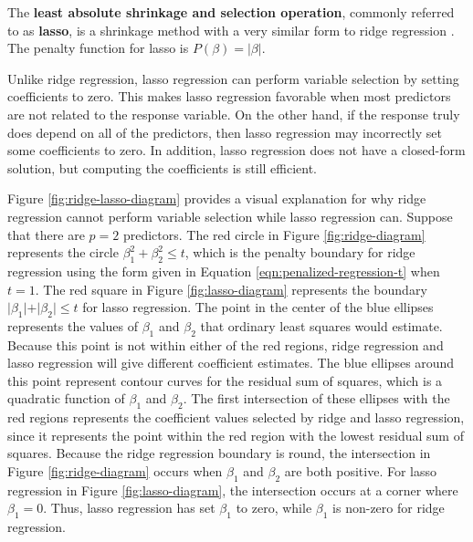 \documentclass{article}
\begin{document}
	The \textbf{least absolute shrinkage and selection operation}, commonly referred to as \textbf{lasso}, is a shrinkage method with a very similar form to ridge regression \cite{tibshirani1996regression, james2013introduction}. The penalty function for lasso is $P(\beta) = \vert \beta \vert$.
	
	Unlike ridge regression, lasso regression can perform variable selection by setting coefficients to zero. This makes lasso regression favorable when most predictors are not related to the response variable. On the other hand, if the response truly does depend on all of the predictors, then lasso regression may incorrectly set some coefficients to zero. In addition, lasso regression does not have a closed-form solution, but computing the coefficients is still efficient.
	
	Figure \ref{fig:ridge-lasso-diagram} provides a visual explanation for why ridge regression cannot perform variable selection while lasso regression can. Suppose that there are $p = 2$ predictors. The red circle in Figure \ref{fig:ridge-diagram} represents the circle $\beta_1^2 + \beta_2^2 \leq t$, which is the penalty boundary for ridge regression using the form given in Equation \ref{eqn:penalized-regression-t} when $t = 1$. The red square in Figure \ref{fig:lasso-diagram} represents the boundary $\vert \beta_1 \vert + \vert \beta_2 \vert \leq t$ for lasso regression. The point in the center of the blue ellipses represents the values of $\beta_1$ and $\beta_2$ that ordinary least squares would estimate. Because this point is not within either of the red regions, ridge regression and lasso regression will give different coefficient estimates. The blue ellipses around this point represent contour curves for the residual sum of squares, which is a quadratic function of $\beta_1$ and $\beta_2$. The first intersection of these ellipses with the red regions represents the coefficient values selected by ridge and lasso regression, since it represents the point within the red region with the lowest residual sum of squares. Because the ridge regression boundary is round, the intersection in Figure \ref{fig:ridge-diagram} occurs when $\beta_1$ and $\beta_2$ are both positive. For lasso regression in Figure \ref{fig:lasso-diagram}, the intersection occurs at a corner where $\beta_1=0$. Thus, lasso regression has set $\beta_1$ to zero, while $\beta_1$ is non-zero for ridge regression.
	
\end{document}
